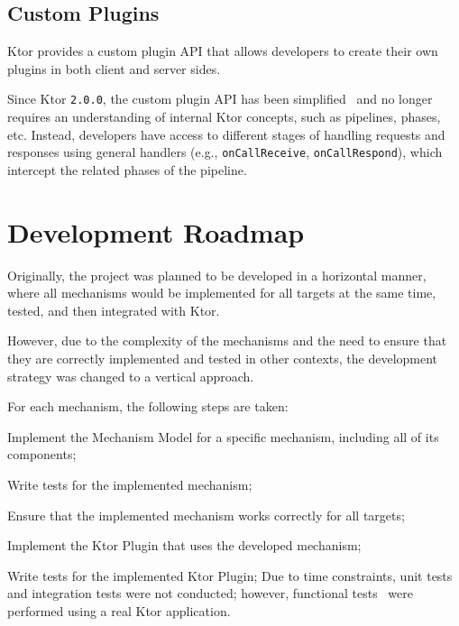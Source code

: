 \subsection{Custom Plugins}\label{subsec:custom-plugins}

Ktor provides a custom plugin API that allows developers to create their own plugins in both client and server sides.

Since Ktor \texttt{2.0.0}, the custom plugin API has been simplified~\cite{ktor-server-custom-plugins, ktor-client-custom-plugins} and no longer requires an understanding of internal Ktor concepts, such as pipelines, phases, etc.
Instead, developers have access to different stages of handling requests and responses using general handlers (e.g., \texttt{onCallReceive}, \texttt{onCallRespond}), which intercept the related phases of the pipeline.


\section{Development Roadmap}\label{sec:development-roadmap}

Originally, the project was planned to be developed in a horizontal manner, where all mechanisms would be implemented for all targets at the same time, tested, and then integrated with Ktor.

However, due to the complexity of the mechanisms and the need to ensure that they are correctly implemented and tested
in other contexts, the development strategy was changed to a vertical approach.

For each mechanism, the following steps are taken:
\begin{boldenumerate}
    \item Implement the Mechanism Model for a specific mechanism, including all of its components;
    \item Write tests for the implemented mechanism;
    \item Ensure that the implemented mechanism works correctly for all targets;
    \item Implement the Ktor Plugin that uses the developed mechanism;
    \item Write tests for the implemented Ktor Plugin;
    Due to time constraints, unit tests and integration tests were not conducted; however, functional tests~\cite{software-test-types} were performed using a real Ktor application.
\end{boldenumerate}

